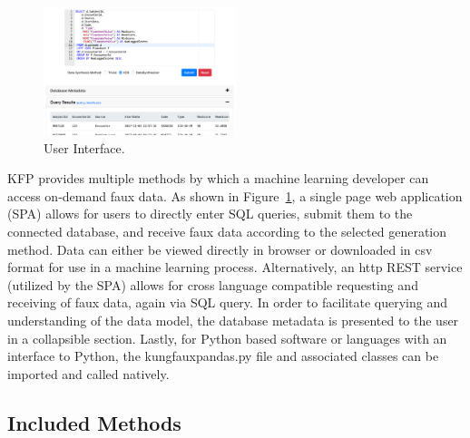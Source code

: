 \documentclass{article}
\begin{document}
\begin{figure}%
  \centering
  \includegraphics[width=0.5\textwidth]{ui_screenshot3}
  \caption{User Interface.}
  \label{fig:ui}
\end{figure}
KFP provides multiple methods by which a machine learning developer can access on-demand faux data. As shown in Figure~\ref{fig:ui}, a single page web application (SPA) allows for users to directly enter SQL queries, submit them to the connected database, and receive faux data according to the selected generation method. Data can either be viewed directly in browser or downloaded in csv format for use in a machine learning process. Alternatively, an http REST service (utilized by the SPA) allows for cross language compatible requesting and receiving of faux data, again via SQL query. In order to facilitate querying and understanding of the data model, the database metadata is presented to the user in a collapsible section. Lastly, for Python based software or languages with an interface to Python, the kungfauxpandas.py file and associated classes can be imported and called natively.

\subsection{Included Methods}
\end{document}
